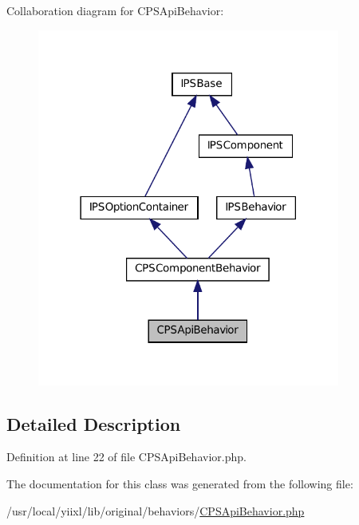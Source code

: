 Collaboration diagram for CPSApiBehavior:\nopagebreak
\begin{figure}[H]
\begin{center}
\leavevmode
\includegraphics[width=282pt]{classCPSApiBehavior__coll__graph}
\end{center}
\end{figure}


\subsection{Detailed Description}


Definition at line 22 of file CPSApiBehavior.php.



The documentation for this class was generated from the following file:\begin{DoxyCompactItemize}
\item 
/usr/local/yiixl/lib/original/behaviors/\hyperlink{CPSApiBehavior_8php}{CPSApiBehavior.php}\end{DoxyCompactItemize}
